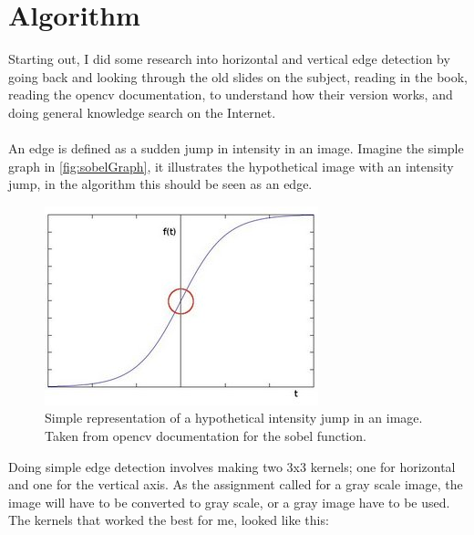 \chapter{Algorithm}
	Starting out, I did some research into horizontal and vertical edge detection by going back and looking through the old slides on the subject, reading in the book, reading the opencv documentation, to understand how their version works, and doing general knowledge search on the Internet.\\
	\\
	An edge is defined as a sudden jump in intensity in an image. Imagine the simple graph in \autoref{fig:sobelGraph}, it illustrates the hypothetical image with an intensity jump, in the algorithm this should be seen as an edge.
	
	\begin{figure}[H]
		\centering
		\includegraphics[width=0.4\linewidth]{figure/sobelGraph}
		\caption{Simple representation of a hypothetical intensity jump in an image. Taken from opencv documentation for the sobel function.}
		\label{fig:sobelGraph}
	\end{figure} 
	
	Doing simple edge detection involves making two 3x3 kernels; one for horizontal and one for the vertical axis. As the assignment called for a gray scale image, the image will have to be converted to gray scale, or a gray image have to be used. The kernels that worked the best for me, looked like this:
	
